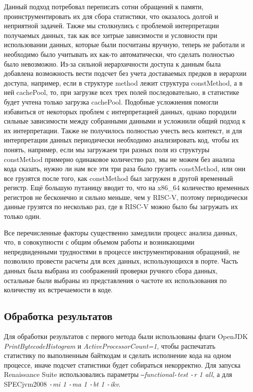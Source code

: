 Данный подход потребовал переписать сотни обращений к памяти, проинструментировать их для сбора статистики, что оказалось долгой и неприятной задачей. Также мы столкнулись с проблемой интерпретации получаемых данных, так как все хитрые зависимости и условности при использовании данных, которые были посчитаны вручную, теперь не работали и необходимо было учитывать их как-то автоматически, что сделать полностью было невозможно. Из-за сильной иерархичности доступа к данным была добавлена возможность вести подсчет без учета доставаемых предков в иерархии доступа, например, если в структуре method лежит структура constMethod, а в ней cachePool, то, при загрузке всех трех полей последовательно, в статистике будет учтена только загрузка cachePool. Подобные усложнения помогли избавиться от некоторых проблем с интерпретацией данных, однако породили сильные зависимости между собранными данными и усложнили общий подход к их интерпретации. Также не получилось полностью учесть весь контекст, и для интерпретации данных периодически необходимо анализировать код, чтобы их понять, например, если мы загружаем три разных поля из структуры constMethod примерно одинаковое количество раз, мы не можем без анализа кода сказать, нужно ли нам все эти три раза было грузить constMethod, или они все грузятся после того, как constMethod был загружен в другой временный регистр. Ещё большую путаницу вводит то, что на x86\_64 количество временных регистров не бесконечно и сильно меньше, чем у RISC-V, поэтому периодически данные грузятся по несколько раз, где в RISC-V можно было бы загружать их только один.

Все перечисленные факторы существенно замедлили процесс анализа данных, что, в совокупности с общим объемом работы и возникающими непредвиденными трудностями в процессе инструментирования обращений, не позволило провести расчеты для всех данных, использующихся в порте. Часть данных была выбрана из соображений проверки ручного сбора данных, остальные были выбраны из представления о частоте их использования по количеству их встречаемости в коде.



\subsection{Обработка результатов}

Для обработки результатов с первого метода были использованы флаги OpenJDK \textit{PrintBytecodeHistogram} и \textit{ActiveProcessorCount=1}, чтобы распечатать статистику по выполненным байткодам и сделать исполнение кода на одном процессе, иначе подсчет статистики будет собираться некорректно. Для запуска Renaissance Suite использовались параметры \textit{\texttt{--}functional\texttt{-}test \texttt{-}r 1 all}, а для SPECjvm2008 \textit{\texttt{-}mi 1 \texttt{-}ma 1 \texttt{-}bt 1 \texttt{-}ikv}.

